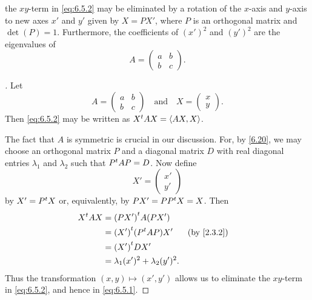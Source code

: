 \begin{cor}\label{6.5.19}
  the \(xy\)-term in \cref{eq:6.5.2} may be eliminated by a rotation of the \(x\)-axis and \(y\)-axis to new axes \(x'\) and \(y'\) given by \(X = P X'\), where \(P\) is an orthogonal matrix and \(\det(P) = 1\).
  Furthermore, the coefficients of \((x')^2\) and \((y')^2\) are the eigenvalues of
  \[
    A = \begin{pmatrix}
      a & b \\
      b & c
    \end{pmatrix}.
  \]
\end{cor}

\begin{proof}[]
  Let
  \[
    A = \begin{pmatrix}
      a & b \\
      b & c
    \end{pmatrix} \quad \text{and} \quad X = \begin{pmatrix}
      x \\
      y
    \end{pmatrix}.
  \]
  Then \cref{eq:6.5.2} may be written as \({X}^{t} A X = \left\langle AX, X\right\rangle\).

  The fact that \(A\) is symmetric is crucial in our discussion.
  For, by \cref{6.20}, we may choose an orthogonal matrix \(P\) and a diagonal matrix \(D\) with real diagonal entries \(\lambda_1\) and \(\lambda_2\) such that \({P}^{t} A P = D\).
  Now define
  \[
    X' = \begin{pmatrix}
      x' \\
      y'
    \end{pmatrix}
  \]
  by \(X' = {P}^{t} X\) or, equivalently, by \(P X' = P {P}^{t} X = X\).
  Then
  \begin{align*}
    \tp{X} A X & = \tp{(P X')} A (P X')                                 \\
               & = \tp{(X')} (\tp{P} A P) X'            &  & \by{2.3.2} \\
               & = \tp{(X')} D X'                                       \\
               & = \lambda_1 (x')^2 + \lambda_2 (y')^2.
  \end{align*}
  Thus the transformation \((x, y) \mapsto (x', y')\) allows us to eliminate the \(xy\)-term in \cref{eq:6.5.2}, and hence in \cref{eq:6.5.1}.


\end{proof}
